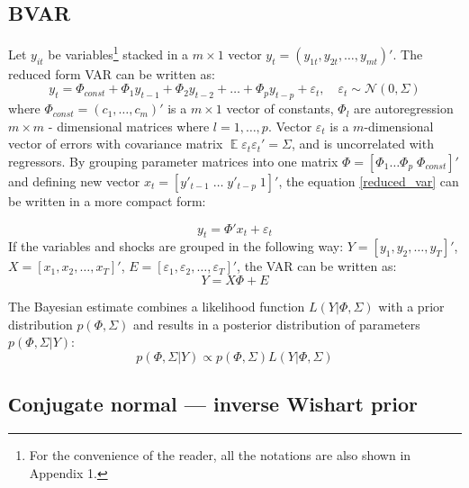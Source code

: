 \documentclass[11pt]{article} %
\DeclareMathOperator{\E}{\mathbb{E}}
\newcommand{\cN}{\mathcal{N}}
\let\vec\relax
\DeclareMathOperator{\vec}{vec}
\begin{document}
\subsection{BVAR}
Let $y_{it}$ be variables\footnote{For the convenience of the reader, all the notations are also shown in Appendix 1.} stacked in a  $m\times 1$ vector $y_{t}=(y_{1t},y_{2t},\ldots, y_{mt})'$. The reduced form VAR can be written as:
\begin{equation}
y_t =\Phi_{const}+ \Phi_1 y_{t-1} + \Phi_2 y_{t-2} +\ldots + \Phi_p y_{t-p} + \varepsilon_t,\quad \varepsilon_t\sim \cN(0,\Sigma)\label{reduced_var}
\end{equation}
where $\Phi_{const}=(c_1,\ldots ,c_m)'$ is a $m\times 1$  vector of constants, $\Phi_l$ are autoregression   $m\times m$ - dimensional matrices where $l=1, \ldots, p$. Vector $\varepsilon_t$ is a $m$-dimensional vector of errors with  covariance matrix $\E\varepsilon_t \varepsilon _t'=\Sigma$, and is uncorrelated with regressors.
By grouping parameter matrices into one matrix  $\Phi=[\Phi_1 \ldots \Phi_p \; \Phi_{const}]'$ %
and defining new vector $x_t=[ y'_{t-1}\;  \ldots  \; y'_{t-p} \; 1]'$, the equation \eqref{reduced_var} can be written in a more compact form:

\begin{equation}
y_t=\Phi' x_t+\varepsilon_t
\end{equation}
If the variables and shocks are grouped in the following way: $Y=[y_1, y_2,\ldots, y_T]'$, $X=[x_1, x_2,\ldots, x_T]'$, $E=[\varepsilon_1, \varepsilon_2,\ldots, \varepsilon_T]'$, the VAR can be written as:
\begin{equation}
Y=X\Phi+E\label{var}
\end{equation}


The Bayesian estimate combines a likelihood function $L(Y|\Phi, \Sigma)$ with a prior distribution $p(\Phi, \Sigma)$ and results in a posterior distribution of parameters $p(\Phi, \Sigma|Y)$: %
\begin{equation}
p(\Phi, \Sigma|Y)\propto p(\Phi,\Sigma) L(Y|\Phi,\Sigma)
\end{equation}


\subsection{Сonjugate normal --- inverse Wishart prior}
\end{document}
